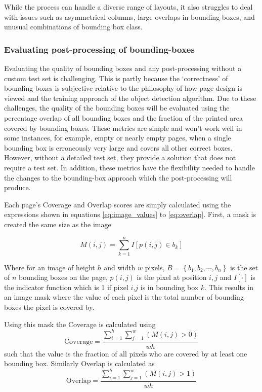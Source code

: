 \documentclass{article} %
\begin{document}
While the process can handle a diverse range of layouts, it also struggles to deal with issues such as asymmetrical columns, large overlaps in bounding boxes, and unusual combinations of bounding box class.


\subsubsection{Evaluating post-processing of bounding-boxes}

Evaluating the quality of bounding boxes and any post-processing without a custom test set is challenging. This is partly because the `correctness' of bounding boxes is subjective relative to the philosophy of how page design is viewed and the training approach of the object detection algorithm. Due to these challenges, the quality of the bounding boxes will be evaluated using the percentage overlap of all bounding boxes and the fraction of the printed area covered by bounding boxes. These metrics are simple and won't work well in some instances, for example, empty or nearly empty pages,  when a single bounding box is erroneously very large and covers all other correct boxes. However, without a detailed test set, they provide a solution that does not require a test set. In addition, these metrics have the flexibility needed to handle the changes to the bounding-box approach which the post-processing will produce. 

Each page's Coverage and Overlap scores are simply calculated using the expressions shown in equations \ref{eq:image_values} to \ref{eq:overlap}. First, a mask is created the same size as the image

\begin{equation}
    M(i,j) = \sum_{k=1}^n I\left[  p(i,j) \in b_k \right]
    \label{eq:image_values}
\end{equation}

Where for an image of height $h$ and width $w$ pixels, $B = \left\{  b_1, b_2, \cdots, b_n \right\}$ is the set of $n$ bounding boxes on the page, $p(i,j)$ is the pixel at position $i,j$ and $I\left[ \cdot \right]$ is the indicator function which is 1 if pixel $i$,$j$ is in bounding box $k$. This results in an image mask where the value of each pixel is the total number of bounding boxes the pixel is covered by.

Using this mask the Coverage is calculated using
\begin{equation}
    \text{Coverage} = \frac{\sum_{i=1}^h \sum_{j=1}^w (M(i,j) > 0)}{wh}
    \label{eq:coverage}
\end{equation}
such that the value is the fraction of all pixels who are covered by at least one bounding box.
Similarly Overlap is calculated as
\begin{equation}
    \text{Overlap} = \frac{ \sum_{i=1}^h \sum_{j=1}^w  (M(i,j) > 1)}{wh}
    \label{eq:overlap}
\end{equation}
\end{document}
